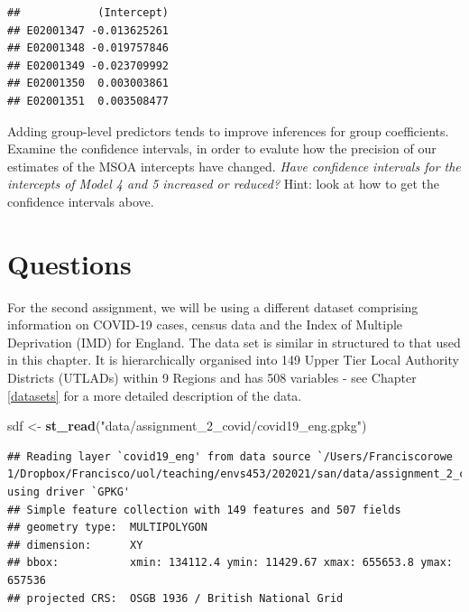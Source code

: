 \documentclass[
]{book}
\newenvironment{Shaded}{\begin{snugshade}}{\end{snugshade}}
\newcommand{\CommentTok}[1]{\textcolor[rgb]{0.56,0.35,0.01}{\textit{#1}}}
\newcommand{\DecValTok}[1]{\textcolor[rgb]{0.00,0.00,0.81}{#1}}
\newcommand{\KeywordTok}[1]{\textcolor[rgb]{0.13,0.29,0.53}{\textbf{#1}}}
\newcommand{\NormalTok}[1]{#1}
\newcommand{\OperatorTok}[1]{\textcolor[rgb]{0.81,0.36,0.00}{\textbf{#1}}}
\newcommand{\StringTok}[1]{\textcolor[rgb]{0.31,0.60,0.02}{#1}}
\begin{document}
\begin{Shaded}
\end{Shaded}

\begin{verbatim}
##            (Intercept)
## E02001347 -0.013625261
## E02001348 -0.019757846
## E02001349 -0.023709992
## E02001350  0.003003861
## E02001351  0.003508477
\end{verbatim}

Adding group-level predictors tends to improve inferences for group coefficients. Examine the confidence intervals, in order to evalute how the precision of our estimates of the MSOA intercepts have changed. \emph{Have confidence intervals for the intercepts of Model 4 and 5 increased or reduced?} Hint: look at how to get the confidence intervals above.

\hypertarget{questions-3}{%
\section{Questions}\label{questions-3}}

For the second assignment, we will be using a different dataset comprising information on COVID-19 cases, census data and the Index of Multiple Deprivation (IMD) for England. The data set is similar in structured to that used in this chapter. It is hierarchically organised into 149 Upper Tier Local Authority Districts (UTLADs) within 9 Regions and has 508 variables - see Chapter \ref{datasets} for a more detailed description of the data.

\begin{Shaded}
\begin{Highlighting}[]
\NormalTok{sdf <-}\StringTok{ }\KeywordTok{st_read}\NormalTok{(}\StringTok{"data/assignment_2_covid/covid19_eng.gpkg"}\NormalTok{)}
\end{Highlighting}
\end{Shaded}

\begin{verbatim}
## Reading layer `covid19_eng' from data source `/Users/Franciscorowe 1/Dropbox/Francisco/uol/teaching/envs453/202021/san/data/assignment_2_covid/covid19_eng.gpkg' using driver `GPKG'
## Simple feature collection with 149 features and 507 fields
## geometry type:  MULTIPOLYGON
## dimension:      XY
## bbox:           xmin: 134112.4 ymin: 11429.67 xmax: 655653.8 ymax: 657536
## projected CRS:  OSGB 1936 / British National Grid
\end{verbatim}
\end{document}
